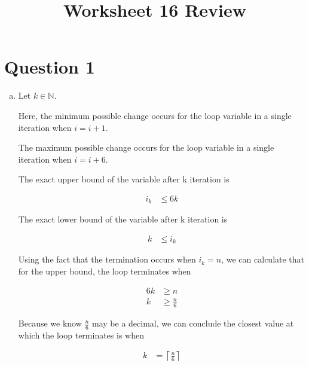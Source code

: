\documentclass[12pt]{article}
\begin{document}
\title{Worksheet 16 Review}
\maketitle

\section*{Question 1}
\begin{enumerate}[a.]
    \item

    Let $k \in \mathbb{N}$.

    \bigskip

    Here, the minimum possible change occurs for the loop variable in a single
    iteration when $i = i + 1$.

    \bigskip

    The maximum possible change occurs for the loop variable in a single
    iteration when $i = i + 6$.

    \bigskip

    The exact upper bound of the variable after k iteration is

    \begin{align}
        i_k &\leq 6k
    \end{align}

    \bigskip

    The exact lower bound of the variable after k iteration is

    \begin{align}
        k &\leq i_k
    \end{align}

    \bigskip

    Using the fact that the termination occurs when $i_k = n$, we can calculate
    that for the upper bound, the loop terminates when

    \begin{align}
        6k &\geq n\\
        k &\geq \frac{n}{6}
    \end{align}

    Because we know $\frac{n}{6}$ may be a decimal, we can conclude the closest value at
    which the loop terminates is when

    \begin{align}
        k &= \left\lceil \frac{n}{6} \right\rceil
    \end{align}

    \bigskip


\end{enumerate}
\end{document}
